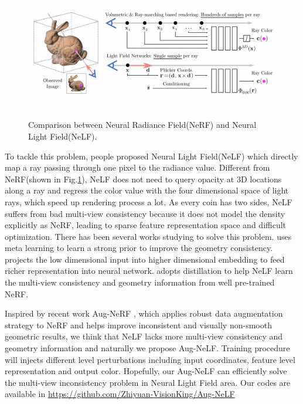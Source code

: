 \documentclass[10pt,twocolumn,letterpaper]{article}
\begin{document}
\begin{figure}
  \includegraphics[width=\textwidth,height=6cm]{figures/nerf_vs_nelf.png}
  \caption{Comparison between Neural Radiance Field(NeRF) and Neural Light Field(NeLF).}
  \label{fig1}
\end{figure}

To tackle this problem, people proposed Neural Light Field(NeLF) \cite{sitzmann2021light} which directly map a ray passing through one pixel to the radiance value. Different from NeRF(shown in Fig.\ref{fig1}), NeLF does not need to query opacity at 3D locations along a ray and regress the color value with the four dimensional space of light rays, which speed up rendering process a lot. As every coin has two sides, NeLF suffers from bad multi-view consistency because it does not model the density explicitly as NeRF, leading to sparse feature representation space and difficult optimization. There has been several works studying to solve this problem. \cite{sitzmann2021light} uses meta learning to learn a strong prior to improve the geometry consistency. \cite{attal2022learning} projects the low dimensional input into higher dimensional embedding to feed richer representation into neural network. \cite{wang2022r2l} adopts distillation to help NeLF learn the multi-view consistency and geometry information from well pre-trained NeRF. 

Inspired by recent work Aug-NeRF \cite{chen2022aug}, which applies robust data augmentation strategy to NeRF and helps improve inconsistent and visually non-smooth geometric results, we think that NeLF lacks more multi-view consistency and geometry information and naturally we propose Aug-NeLF. Training procedure will injects different level perturbations including input coordinates, feature level representation and output color. Hopefully, our Aug-NeLF can efficiently solve the multi-view inconsistency problem in Neural Light Field area. Our codes are available in \url{https://github.com/Zhiyuan-VisionKing/Aug-NeLF}
\end{document}

